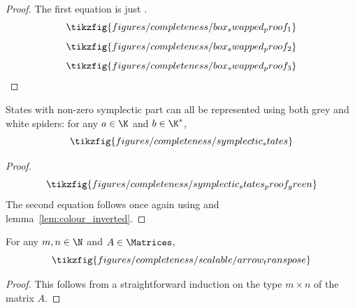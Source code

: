 \begin{proof}
  The first equation is just \TextHBox.
  \begin{equation}
    \tikzfig{figures/completeness/box_swapped_proof_1}
  \end{equation}
  \vspace{5mm}
  \begin{equation}
    \tikzfig{figures/completeness/box_swapped_proof_2}
  \end{equation}
  \vspace{5mm}
  \begin{equation}
    \tikzfig{figures/completeness/box_swapped_proof_3}
  \end{equation}
\end{proof}
\begin{lemma}
  \label{lem:symplectic_states}
  States with non-zero symplectic part can all be represented using both
  grey and white spiders: for any \(a \in \K\) and \(b \in \K^*\),
  \begin{equation*}
    \tikzfig{figures/completeness/symplectic_states}
  \end{equation*}
\end{lemma}
\begin{proof}
  \begin{equation}
    \tikzfig{figures/completeness/symplectic_states_proof_green}
  \end{equation}
  The second equation follows once again using \TextColour and
  lemma~\ref{lem:colour_inverted}.
\end{proof}
\begin{lemma}
  \label{lem:arrow_transpose}
  For any \(m,n \in \N\) and \(A \in \Matrices\),
  \begin{equation*}
    \tikzfig{figures/completeness/scalable/arrow_transpose}
  \end{equation*}
\end{lemma}
\begin{proof}
  This follows from a straightforward induction on the type \(m \times n\)
  of the matrix \(A\).
\end{proof}
